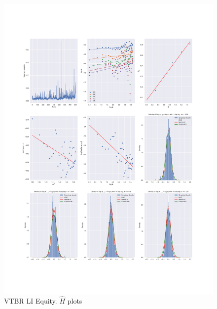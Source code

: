 \begin{figure}[h]
    \centering
    \includegraphics[width=\linewidth]{fig/VTBR LI Equity.pdf}
    \caption{VTBR LI Equity. $\hat{H}$ plots}
\end{figure} 
    
